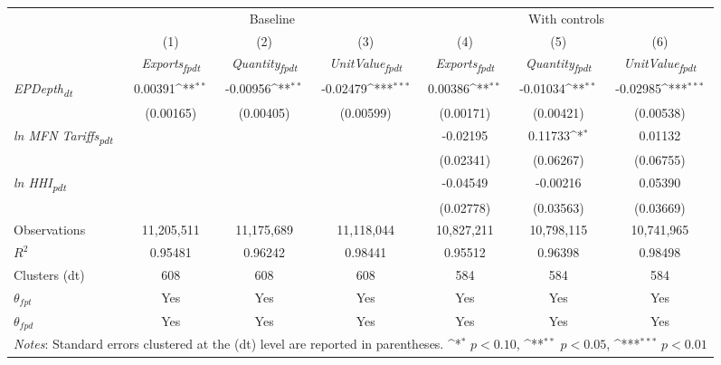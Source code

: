 {
\def\sym#1{\ifmmode^{#1}\else\(^{#1}\)\fi}
\begin{tabular}{l*{6}{c}}
\toprule
&\multicolumn{3}{c}{Baseline}&\multicolumn{3}{c}{With controls}\\\cmidrule(lr){2-4}\cmidrule(lr){5-7}
&(1)&(2)&(3)&(4)&(5)&(6)\\
&\textit{Exports\textsubscript{fpdt}}&\textit{Quantity\textsubscript{fpdt}}&\textit{UnitValue\textsubscript{fpdt}}&\textit{Exports\textsubscript{fpdt}}&\textit{Quantity\textsubscript{fpdt}}&\textit{UnitValue\textsubscript{fpdt}}\\
\midrule
\textit{EPDepth\textsubscript{dt}} & 0.00391\sym{**} & -0.00956\sym{**} & -0.02479\sym{***} & 0.00386\sym{**} & -0.01034\sym{**} & -0.02985\sym{***}\\
 & (0.00165) & (0.00405) & (0.00599) & (0.00171) & (0.00421) & (0.00538)\\
\addlinespace
\textit{ln MFN Tariffs\textsubscript{pdt}} &  &  &  & -0.02195 & 0.11733\sym{*} & 0.01132\\
 &  &  &  & (0.02341) & (0.06267) & (0.06755)\\
\addlinespace
\textit{ln HHI\textsubscript{pdt}} &  &  &  & -0.04549 & -0.00216 & 0.05390\\
 &  &  &  & (0.02778) & (0.03563) & (0.03669)\\
\midrule
Observations & 11,205,511 & 11,175,689 & 11,118,044 & 10,827,211 & 10,798,115 & 10,741,965\\
$R^{2}$ & 0.95481 & 0.96242 & 0.98441 & 0.95512 & 0.96398 & 0.98498\\
Clusters (dt) & 608 & 608 & 608 & 584 & 584 & 584\\
$\theta_{fpt}$ & Yes & Yes & Yes & Yes & Yes & Yes\\
$\theta_{fpd}$ & Yes & Yes & Yes & Yes & Yes & Yes\\
\bottomrule
\multicolumn{7}{l}{\footnotesize \textit{Notes}: Standard errors clustered at the (dt) level are reported in parentheses. \sym{*} \(p<0.10\), \sym{**} \(p<0.05\), \sym{***} \(p<0.01\)}\\
\end{tabular}
}
